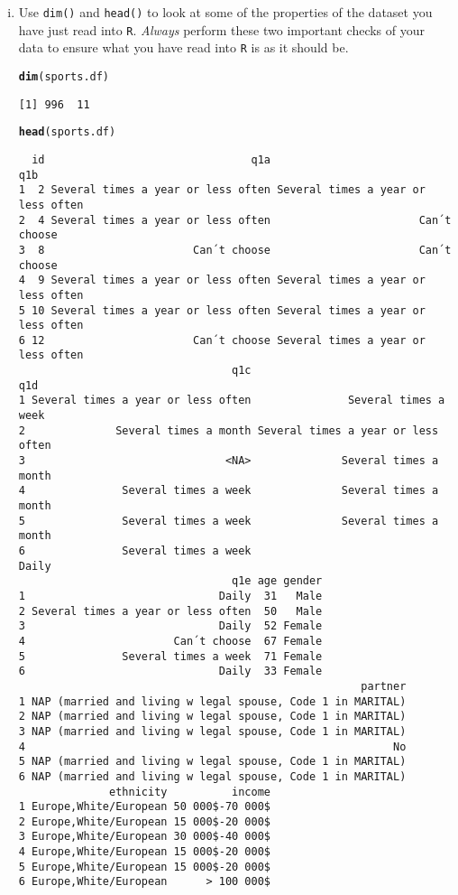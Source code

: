 \documentclass[12pt,a4paper]{article}\usepackage[]{graphicx}\usepackage[]{color}
\makeatletter
\newcommand{\hlstd}[1]{\textcolor[rgb]{0.345,0.345,0.345}{#1}}%
\newcommand{\hlkwd}[1]{\textcolor[rgb]{0.737,0.353,0.396}{\textbf{#1}}}%
\newenvironment{kframe}{%
 \def\at@end@of@kframe{}%
 \ifinner\ifhmode%
  \def\at@end@of@kframe{\end{minipage}}%
  \begin{minipage}{\columnwidth}%
 \fi\fi%
 \def\FrameCommand##1{\hskip\@totalleftmargin \hskip-\fboxsep
 \colorbox{shadecolor}{##1}\hskip-\fboxsep
     \hskip-\linewidth \hskip-\@totalleftmargin \hskip\columnwidth}%
 \MakeFramed {\advance\hsize-\width
   \@totalleftmargin\z@ \linewidth\hsize
   \@setminipage}}%
 {\par\unskip\endMakeFramed%
 \at@end@of@kframe}
\newenvironment{knitrout}{}{} %
\makeatother
\begin{document}
\begin{enumerate}[(i)]
\item Use \texttt{dim()} and \texttt{head()} to look at some of the
  properties of the dataset you have just read into
  \texttt{R}. \emph{Always} perform these two important checks of your
  data to ensure what you have read into \texttt{R} is as it should
  be.
\begin{knitrout}
\color{fgcolor}\begin{kframe}
\begin{alltt}
\hlkwd{dim}\hlstd{(sports.df)}
\end{alltt}
\begin{verbatim}
[1] 996  11
\end{verbatim}
\begin{alltt}
\hlkwd{head}\hlstd{(sports.df)}
\end{alltt}
\begin{verbatim}
  id                                q1a                                q1b
1  2 Several times a year or less often Several times a year or less often
2  4 Several times a year or less often                       Can´t choose
3  8                       Can´t choose                       Can´t choose
4  9 Several times a year or less often Several times a year or less often
5 10 Several times a year or less often Several times a year or less often
6 12                       Can´t choose Several times a year or less often
                                 q1c                                q1d
1 Several times a year or less often               Several times a week
2              Several times a month Several times a year or less often
3                               <NA>              Several times a month
4               Several times a week              Several times a month
5               Several times a week              Several times a month
6               Several times a week                              Daily
                                 q1e age gender
1                              Daily  31   Male
2 Several times a year or less often  50   Male
3                              Daily  52 Female
4                       Can´t choose  67 Female
5               Several times a week  71 Female
6                              Daily  33 Female
                                                     partner
1 NAP (married and living w legal spouse, Code 1 in MARITAL)
2 NAP (married and living w legal spouse, Code 1 in MARITAL)
3 NAP (married and living w legal spouse, Code 1 in MARITAL)
4                                                         No
5 NAP (married and living w legal spouse, Code 1 in MARITAL)
6 NAP (married and living w legal spouse, Code 1 in MARITAL)
              ethnicity          income
1 Europe,White/European 50 000$-70 000$
2 Europe,White/European 15 000$-20 000$
3 Europe,White/European 30 000$-40 000$
4 Europe,White/European 15 000$-20 000$
5 Europe,White/European 15 000$-20 000$
6 Europe,White/European      > 100 000$
\end{verbatim}
\end{kframe}
\end{knitrout}


\end{enumerate}
\end{document}

